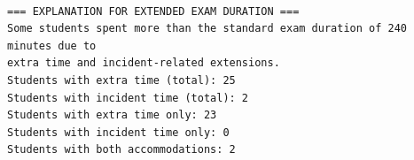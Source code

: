 \documentclass[11pt]{article}
\begin{document}
    \begin{center}
    \end{center}
    { \hspace*{\fill} \\}
    
    \begin{Verbatim}[commandchars=\\\{\}]
=== EXPLANATION FOR EXTENDED EXAM DURATION ===
Some students spent more than the standard exam duration of 240 minutes due to
extra time and incident-related extensions.
Students with extra time (total): 25
Students with incident time (total): 2
Students with extra time only: 23
Students with incident time only: 0
Students with both accommodations: 2

    \end{Verbatim}


    
    
    
\end{document}
